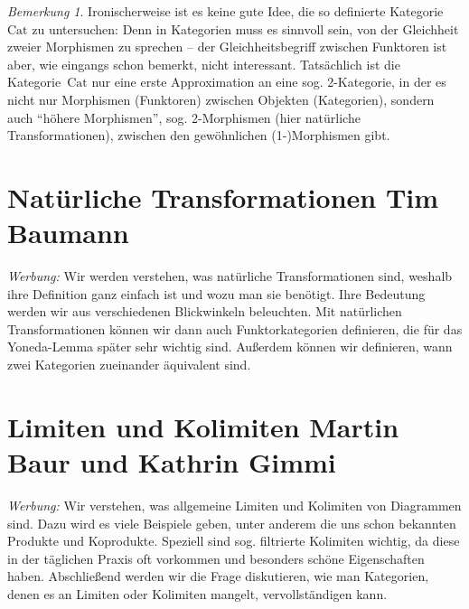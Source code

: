 \documentclass[a4paper,ngerman]{scrartcl}
\theoremstyle{definition}
\theoremstyle{plain}
\theoremstyle{remark}
\newtheorem{bem}[defn]{Bemerkung}
\newcommand{\Cat}{\mathrm{Cat}}
\begin{document}
\begin{bem}Ironischerweise ist es keine gute Idee, die so definierte
Kategorie~$\Cat$ zu untersuchen: Denn in Kategorien muss es sinnvoll sein, von
der Gleichheit zweier Morphismen zu sprechen -- der Gleichheitsbegriff zwischen
Funktoren ist aber, wie eingangs schon bemerkt, nicht interessant. Tatsächlich ist
die Kategorie~$\Cat$ nur eine erste Approximation an eine sog. 2-Kategorie, in
der es nicht nur Morphismen (Funktoren) zwischen Objekten (Kategorien), sondern
auch "`höhere Morphismen"', sog. 2-Morphismen (hier natürliche
Transformationen), zwischen den gewöhnlichen (1-)Morphismen gibt.
\end{bem}



\section[Natürliche Transformationen]{Natürliche Transformationen \hfill \small
Tim Baumann}

\emph{Werbung:} Wir werden verstehen, was natürliche Transformationen sind,
weshalb ihre Definition ganz einfach ist und wozu man sie benötigt. Ihre
Bedeutung werden wir aus verschiedenen Blickwinkeln beleuchten. Mit natürlichen
Transformationen können wir dann auch Funktorkategorien definieren, die für das
Yoneda-Lemma später sehr wichtig sind. Außerdem können wir definieren, wann
zwei Kategorien zueinander äquivalent sind.


\section[Limiten und Kolimiten]{Limiten und Kolimiten \hfill \small
Martin Baur und Kathrin Gimmi}

\emph{Werbung:} Wir verstehen, was allgemeine Limiten und Kolimiten von
Diagrammen sind. Dazu wird es viele Beispiele geben, unter anderem die uns
schon bekannten Produkte und Koprodukte. Speziell sind sog. filtrierte
Kolimiten wichtig, da diese in der täglichen Praxis oft vorkommen und besonders
schöne Eigenschaften haben. Abschließend werden wir die Frage diskutieren, wie
man Kategorien, denen es an Limiten oder Kolimiten mangelt, vervollständigen
kann.
\end{document}
